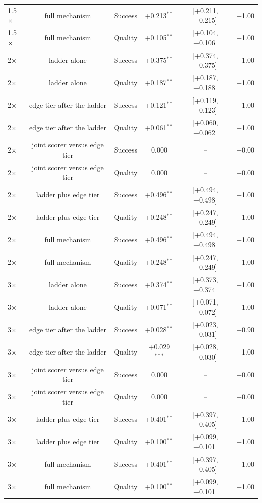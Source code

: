 \begin{table}
\begin{tabular}{lccccc}
1.5$\times$ & full mechanism & Success & +0.213$^{**}$ & [+0.211, +0.215] & +1.00 \\
1.5$\times$ & full mechanism & Quality & +0.105$^{**}$ & [+0.104, +0.106] & +1.00 \\
2$\times$ & ladder alone & Success & +0.375$^{**}$ & [+0.374, +0.375] & +1.00 \\
2$\times$ & ladder alone & Quality & +0.187$^{**}$ & [+0.187, +0.188] & +1.00 \\
2$\times$ & edge tier after the ladder & Success & +0.121$^{**}$ & [+0.119, +0.123] & +1.00 \\
2$\times$ & edge tier after the ladder & Quality & +0.061$^{**}$ & [+0.060, +0.062] & +1.00 \\
2$\times$ & joint scorer versus edge tier & Success & 0.000 & -- & +0.00 \\
2$\times$ & joint scorer versus edge tier & Quality & 0.000 & -- & +0.00 \\
2$\times$ & ladder plus edge tier & Success & +0.496$^{**}$ & [+0.494, +0.498] & +1.00 \\
2$\times$ & ladder plus edge tier & Quality & +0.248$^{**}$ & [+0.247, +0.249] & +1.00 \\
2$\times$ & full mechanism & Success & +0.496$^{**}$ & [+0.494, +0.498] & +1.00 \\
2$\times$ & full mechanism & Quality & +0.248$^{**}$ & [+0.247, +0.249] & +1.00 \\
3$\times$ & ladder alone & Success & +0.374$^{**}$ & [+0.373, +0.374] & +1.00 \\
3$\times$ & ladder alone & Quality & +0.071$^{**}$ & [+0.071, +0.072] & +1.00 \\
3$\times$ & edge tier after the ladder & Success & +0.028$^{**}$ & [+0.023, +0.031] & +0.90 \\
3$\times$ & edge tier after the ladder & Quality & +0.029$^{***}$ & [+0.028, +0.030] & +1.00 \\
3$\times$ & joint scorer versus edge tier & Success & 0.000 & -- & +0.00 \\
3$\times$ & joint scorer versus edge tier & Quality & 0.000 & -- & +0.00 \\
3$\times$ & ladder plus edge tier & Success & +0.401$^{**}$ & [+0.397, +0.405] & +1.00 \\
3$\times$ & ladder plus edge tier & Quality & +0.100$^{**}$ & [+0.099, +0.101] & +1.00 \\
3$\times$ & full mechanism & Success & +0.401$^{**}$ & [+0.397, +0.405] & +1.00 \\
3$\times$ & full mechanism & Quality & +0.100$^{**}$ & [+0.099, +0.101] & +1.00 \\
\bottomrule
\end{tabular}
\par\vspace{2pt}{\footnotesize\raggedright A zero difference carries no stars and no test.\par}
\end{table}
